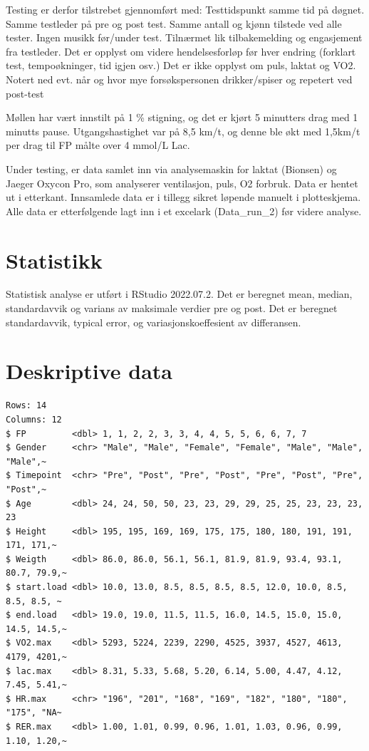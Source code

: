\documentclass[
  letterpaper,
  DIV=11,
  numbers=noendperiod]{scrreprt}
\begin{document}
Testing er derfor tilstrebet gjennomført med: Testtidspunkt samme tid på
døgnet. Samme testleder på pre og post test. Samme antall og kjønn
tilstede ved alle tester. Ingen musikk før/under test. Tilnærmet lik
tilbakemelding og engasjement fra testleder. Det er opplyst om videre
hendelsesforløp før hver endring (forklart test, tempoøkninger, tid
igjen osv.) Det er ikke opplyst om puls, laktat og VO2. Notert ned evt.
når og hvor mye forsøkspersonen drikker/spiser og repetert ved post-test

Møllen har vært innstilt på 1 \% stigning, og det er kjørt 5 minutters
drag med 1 minutts pause. Utgangshastighet var på 8,5 km/t, og denne ble
økt med 1,5km/t per drag til FP målte over 4 mmol/L Lac.

Under testing, er data samlet inn via analysemaskin for laktat (Bionsen)
og Jaeger Oxycon Pro, som analyserer ventilasjon, puls, O2 forbruk. Data
er hentet ut i etterkant. Innsamlede data er i tillegg sikret løpende
manuelt i plotteskjema. Alle data er etterfølgende lagt inn i et
excelark (Data\_run\_2) før videre analyse.


\hypertarget{statistikk}{%
\chapter{Statistikk}\label{statistikk}}

Statistisk analyse er utført i RStudio 2022.07.2. Det er beregnet mean,
median, standardavvik og varians av maksimale verdier pre og post. Det
er beregnet standardavvik, typical error, og variasjonskoeffesient av
differansen.


\hypertarget{deskriptive-data}{%
\chapter{Deskriptive data}\label{deskriptive-data}}

\begin{verbatim}
Rows: 14
Columns: 12
$ FP         <dbl> 1, 1, 2, 2, 3, 3, 4, 4, 5, 5, 6, 6, 7, 7
$ Gender     <chr> "Male", "Male", "Female", "Female", "Male", "Male", "Male",~
$ Timepoint  <chr> "Pre", "Post", "Pre", "Post", "Pre", "Post", "Pre", "Post",~
$ Age        <dbl> 24, 24, 50, 50, 23, 23, 29, 29, 25, 25, 23, 23, 23, 23
$ Height     <dbl> 195, 195, 169, 169, 175, 175, 180, 180, 191, 191, 171, 171,~
$ Weigth     <dbl> 86.0, 86.0, 56.1, 56.1, 81.9, 81.9, 93.4, 93.1, 80.7, 79.9,~
$ start.load <dbl> 10.0, 13.0, 8.5, 8.5, 8.5, 8.5, 12.0, 10.0, 8.5, 8.5, 8.5, ~
$ end.load   <dbl> 19.0, 19.0, 11.5, 11.5, 16.0, 14.5, 15.0, 15.0, 14.5, 14.5,~
$ VO2.max    <dbl> 5293, 5224, 2239, 2290, 4525, 3937, 4527, 4613, 4179, 4201,~
$ lac.max    <dbl> 8.31, 5.33, 5.68, 5.20, 6.14, 5.00, 4.47, 4.12, 7.45, 5.41,~
$ HR.max     <chr> "196", "201", "168", "169", "182", "180", "180", "175", "NA~
$ RER.max    <dbl> 1.00, 1.01, 0.99, 0.96, 1.01, 1.03, 0.96, 0.99, 1.10, 1.20,~
\end{verbatim}
\end{document}
